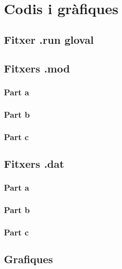 \documentclass[12pt, a4papre]{article}
\begin{document}
	\newpage
	\section{Codis i gràfiques}
	
	\subsection{Fitxer .run gloval}
	
	
	\subsection{Fitxers .mod}
	\subsubsection{Part a}
	
	\subsubsection{Part b}
	
	\subsubsection{Part c}
	
	
	\subsection{Fitxers .dat}
	\subsubsection{Part a}
	
	\subsubsection{Part b}
	
	\subsubsection{Part c}
	
	
	\subsection{Grafiques}
\end{document}
